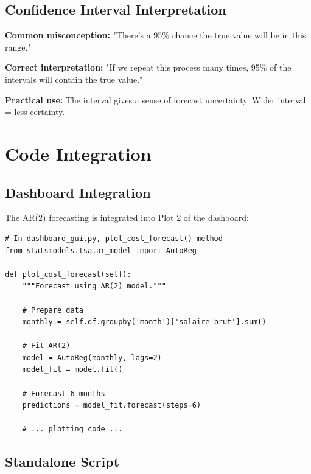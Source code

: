 \subsection{Confidence Interval Interpretation}

\textbf{Common misconception:} "There's a 95\% chance the true value will be in this range."

\textbf{Correct interpretation:} "If we repeat this process many times, 95\% of the intervals will contain the true value."

\textbf{Practical use:} The interval gives a sense of forecast uncertainty. Wider interval = less certainty.

\section{Code Integration}

\subsection{Dashboard Integration}

The AR(2) forecasting is integrated into Plot 2 of the dashboard:

\begin{lstlisting}[style=pythonstyle]
# In dashboard_gui.py, plot_cost_forecast() method
from statsmodels.tsa.ar_model import AutoReg

def plot_cost_forecast(self):
    """Forecast using AR(2) model."""
    
    # Prepare data
    monthly = self.df.groupby('month')['salaire_brut'].sum()
    
    # Fit AR(2)
    model = AutoReg(monthly, lags=2)
    model_fit = model.fit()
    
    # Forecast 6 months
    predictions = model_fit.forecast(steps=6)
    
    # ... plotting code ...
\end{lstlisting}

\subsection{Standalone Script}

